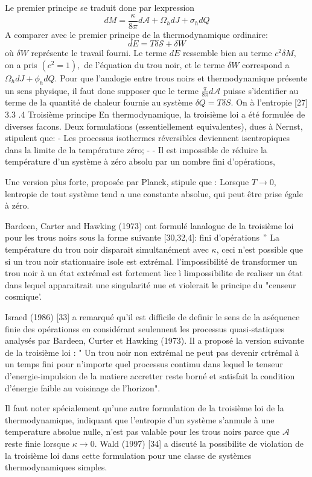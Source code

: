 \documentclass[12pt,  a4paper, openright]{report} %
\begin{document}
Le premier principe se traduit done par lexpression
$$
d M=\frac{\kappa}{8 \pi} d \mathcal{A}+\Omega_{h} d J+\sigma_{h} d Q
$$
A comparer avec le premier principe de la thermodynamique ordinaire:
$$
d E=T \delta \mathcal{S}+\delta W
$$
où $\delta W$ représente le travail fourni. Le terme $d E$ ressemble bien au terme $c^{2} \delta M,$ on a pris $\left(c^{2}=1\right),$ de l'équation du trou noir, et le terme $\delta W$ correspond a $\Omega_{h} d J+\phi_{h} d Q .$ Pour que l'analogie entre trous noirs et thermodynamique présente un sens physique, il faut done supposer que le terme $\frac{\pi}{8 \pi} d \mathcal{A}$ puisse s'identifier au terme de la quantité de chaleur fournie au système $\delta Q=T \delta S$. On
à l'entropie [27]
3.3 .4 Troisième principe
En thermodynamique, la troisième loi a été formulée de diverses facons. Deux formulations (essentiellement equivalentes), dues à Nernst, stipulent que:
- Les processus isothermes réversibles deviennent isentropiques dans la limite de la température zéro;
- - Il est impossible de réduire la température d'un système à zéro absolu par un nombre fini d'opérations,

Une version plus forte, proposée par Planck, stipule que : Lorsque $T \rightarrow 0$, lentropie de tout système tend a une constante absolue, qui peut être prise égale à zéro.

Bardeen, Carter and Hawking (1973) ont formulé lanalogue de la troisième loi pour les trous noirs sous la forme suivante [30,32,4]:
fini d'opérations $"$ La température du trou noir disparait simultanément avec $\kappa$, ceci n'est possible que si un trou noir stationuaire isole est extrémal. l'impossibilité de transformer un trou noir à un état extrémal est fortement lice ì limpossibilite de realiser un état dans lequel apparaitrait une singularité nue et violerait le principe du "censeur cosmique'.

Israed (1986) [33] a remarqué qu'il est difficile de definir le sens de la aséquence finie des opérationss en considérant seulennent les processus quasi-statiques analysés par Bardeen, Curter et Hawking (1973). Il a proposé la version suivante de la troisième loi :
" Un trou noir non extrémal ne peut pas devenir crtrémal à un temps fini pour n'importe quel processus contimu dans lequel le tenseur d'energie-impulsion de la matiere accretter reste borné et satisfait la condition d'énergie faible au voisinage de l'horizon".

Il faut noter spécialement qu'une autre formulation de la troisième loi de la thermodynamique, indiquant que l'entropie d'un système s'anmule à une temperature absolue nulle, n'est pas valable pour les trous noirs parce que $\mathcal{A}$ reste finie lorsque $\kappa \rightarrow 0 .$ Wald (1997) [34] a discuté la possibilite de violation de la troisième loi dans cette formulation pour une classe de systèmes thermodynamiques simples.
\end{document}
